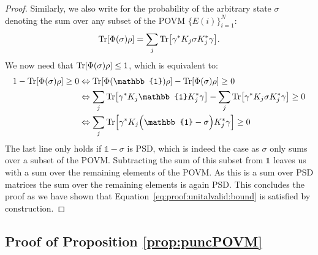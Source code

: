 \begin{proof}
	Similarly, we also write for the probability of the arbitrary state $\sigma$ denoting the sum over any subset of the POVM $\{ E(i) \}_{i=1}^{N}$:
	\begin{align}
		\Tr [ \Phi (\sigma) \rho]
		=
		\sum_j \Tr [\gamma^* K_j \sigma K_j^* \gamma ].
	\end{align}
	We now need that $\Tr [ \Phi (\sigma) \rho]\leq1$, which is equivalent to:
	\begin{align}
		1 - \Tr [ \qop (\sigma) \rho] \geq 0
		 & \Leftrightarrow
		\Tr [ \qop (\mathbb{1}) \rho] - \Tr [ \qop (\sigma) \rho] \geq 0
		\\
		 & \Leftrightarrow
		\sum_j \Tr [\gamma^* \kraus_j  \mathbb{1} \kraus_j^* \gamma ]
		-
		\sum_j \Tr [\gamma^* \kraus_j \sigma \kraus_j^* \gamma ] \geq 0
		\\
		 & \Leftrightarrow
		\sum_j \Tr \Bigl[\gamma^* \kraus_j  \Bigl( \mathbb{1} -\sigma \Bigr)  \kraus_j^* \gamma \Bigr] \geq 0
	\end{align}
	The last line only holds if $\mathbb{1}- \sigma$ is PSD, which is indeed the case as $\sigma$ only sums over a subset of the POVM. Subtracting the sum of this subset from $\mathbb{1}$ leaves us with a sum over the remaining elements of the POVM. As this is a sum over PSD matrices the sum over the remaining elements is again PSD.
	This concludes the proof as we have shown that Equation~\ref{eq:proof:unitalvalid:bound} is satisfied by construction.
\end{proof}




\subsection{Proof of Proposition \ref{prop:puncPOVM}}
\label{sec:proof:prop:puncPOVM}

\proppuncPOVM*

